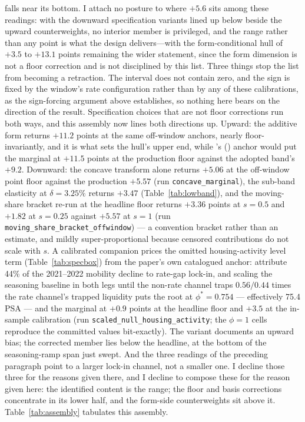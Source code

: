 \documentclass[12pt]{article}
\newcommand{\citepos}[1]{\citeauthor{#1}'s (\citeyear{#1})}
\begin{document}
falls near its bottom. I attach no posture to where $+5.6$ sits among these readings: with the downward specification variants lined up below beside the upward counterweights, no interior member is privileged, and the range rather than any point is what the design delivers---with the form-conditional hull of $+3.5$ to $+13.1$ points remaining the wider statement, since the form dimension is not a floor correction and is not disciplined by this list. Three things stop the list from becoming a retraction. The interval does not contain zero, and the sign is fixed by the window's rate configuration rather than by any of these calibrations, as the sign-forcing argument above establishes, so nothing here bears on the direction of the result. Specification choices that are not floor corrections run both ways, and this assembly now lines both directions up. Upward: the additive form returns $+11.2$ points at the same off-window anchors, nearly floor-invariantly, and it is what sets the hull's upper end, while \citepos{fonseca2024} anchor would put the marginal at $+11.5$ points at the production floor against the adopted band's $+9.2$. Downward: the concave transform alone returns $+5.06$ at the off-window point floor against the production $+5.57$ (run \texttt{concave\_marginal}), the sub-band elasticity at $\delta = 3.25\%$ returns $+3.47$ (Table~\ref{tab:lowband}), and the moving-share bracket re-run at the headline floor returns $+3.36$ points at $s = 0.5$ and $+1.82$ at $s = 0.25$ against $+5.57$ at $s = 1$ (run \texttt{moving\_share\_bracket\_offwindow}) --- a convention bracket rather than an estimate, and mildly super-proportional because censored contributions do not scale with $s$. A calibrated companion prices the omitted housing-activity level term (Table~\ref{tab:specbox}) from the paper's own catalogued anchor: \citet{aladangady2024} attribute 44\% of the 2021--2022 mobility decline to rate-gap lock-in, and scaling the seasoning baseline in both legs until the non-rate channel traps $0.56/0.44$ times the rate channel's trapped liquidity puts the root at $\phi^{*} = 0.754$ --- effectively 75.4 PSA --- and the marginal at $+0.9$ points at the headline floor and $+3.5$ at the in-sample calibration (run \texttt{scaled\_null\_housing\_activity}; the $\phi = 1$ cells reproduce the committed values bit-exactly). The variant documents an upward bias; the corrected member lies below the headline, at the bottom of the seasoning-ramp span just swept. And the three readings of the preceding paragraph point to a larger lock-in channel, not a smaller one. I decline those three for the reasons given there, and I decline to compose these for the reason given here: the identified content is the range; the floor and basis corrections concentrate in its lower half, and the form-side counterweights sit above it. Table~\ref{tab:assembly} tabulates this assembly.
\end{document}
